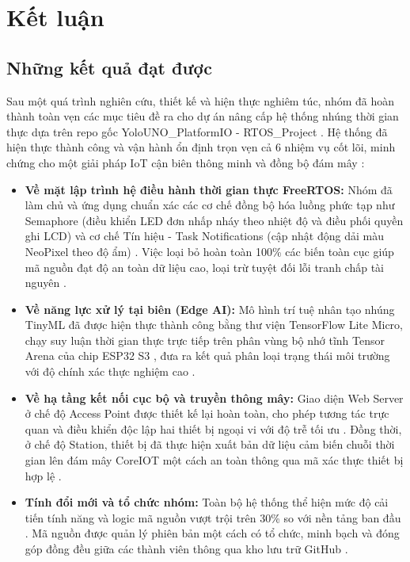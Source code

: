 \section{Kết luận}

\subsection{Những kết quả đạt được}
Sau một quá trình nghiên cứu, thiết kế và hiện thực nghiêm túc, nhóm đã hoàn thành toàn vẹn các mục tiêu đề ra cho dự án nâng cấp hệ thống nhúng thời gian thực dựa trên repo gốc YoloUNO\_PlatformIO - RTOS\_Project \cite{cite: 6, cite: 63}. Hệ thống đã hiện thực thành công và vận hành ổn định trọn vẹn cả 6 nhiệm vụ cốt lõi, minh chứng cho một giải pháp IoT cận biên thông minh và đồng bộ đám mây \cite{cite: 14, cite: 498}:
\begin{itemize}
    \item \textbf{Về mặt lập trình hệ điều hành thời gian thực FreeRTOS:} Nhóm đã làm chủ và ứng dụng chuẩn xác các cơ chế đồng bộ hóa luồng phức tạp như Semaphore (điều khiển LED đơn nhấp nháy theo nhiệt độ và điều phối quyền ghi LCD) \cite{cite: 17, cite: 25} và cơ chế Tín hiệu - Task Notifications (cập nhật động dải màu NeoPixel theo độ ẩm) \cite{cite: 21}. Việc loại bỏ hoàn toàn 100\% các biến toàn cục giúp mã nguồn đạt độ an toàn dữ liệu cao, loại trừ tuyệt đối lỗi tranh chấp tài nguyên \cite{cite: 26}.
    \item \textbf{Về năng lực xử lý tại biên (Edge AI):} Mô hình trí tuệ nhân tạo nhúng TinyML đã được hiện thực thành công bằng thư viện TensorFlow Lite Micro, chạy suy luận thời gian thực trực tiếp trên phân vùng bộ nhớ tĩnh Tensor Arena của chip ESP32 S3 \cite{cite: 31, cite: 33}, đưa ra kết quả phân loại trạng thái môi trường với độ chính xác thực nghiệm cao \cite{cite: 34, cite: 47}.
    \item \textbf{Về hạ tầng kết nối cục bộ và truyền thông mây:} Giao diện Web Server ở chế độ Access Point được thiết kế lại hoàn toàn, cho phép tương tác trực quan và điều khiển độc lập hai thiết bị ngoại vi với độ trễ tối ưu \cite{cite: 28, cite: 30}. Đồng thời, ở chế độ Station, thiết bị đã thực hiện xuất bản dữ liệu cảm biến chuỗi thời gian lên đám mây CoreIOT một cách an toàn thông qua mã xác thực thiết bị hợp lệ \cite{cite: 36, cite: 38}.
    \item \textbf{Tính đổi mới và tổ chức nhóm:} Toàn bộ hệ thống thể hiện mức độ cải tiến tính năng và logic mã nguồn vượt trội trên 30\% so với nền tảng ban đầu \cite{cite: 8}. Mã nguồn được quản lý phiên bản một cách có tổ chức, minh bạch và đóng góp đồng đều giữa các thành viên thông qua kho lưu trữ GitHub \cite{cite: 50, cite: 52, cite: 59}.
\end{itemize}

